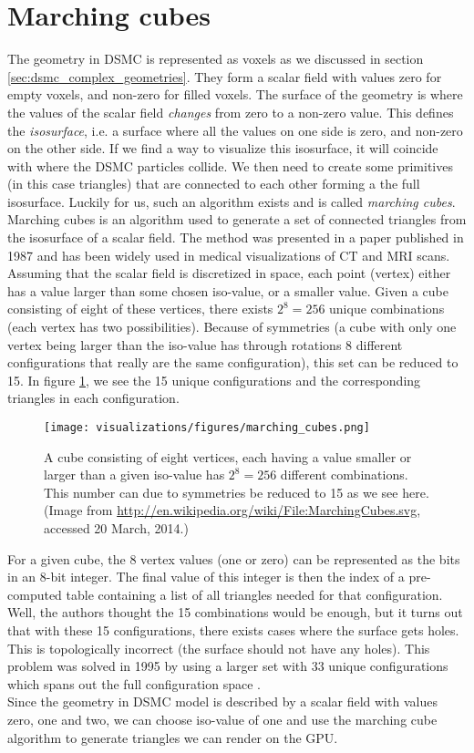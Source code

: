 \section{Marching cubes}
\label{sec:marching_cubes}
The geometry in DSMC is represented as voxels as we discussed in section \ref{sec:dsmc_complex_geometries}. They form a scalar field with values zero for empty voxels, and non-zero for filled voxels. The surface of the geometry is where the values of the scalar field \textit{changes} from zero to a non-zero value. This defines the \textit{isosurface}, i.e. a surface where all the values on one side is zero, and non-zero on the other side. If we find a way to visualize this isosurface, it will coincide with where the DSMC particles collide. We then need to create some primitives (in this case triangles) that are connected to each other forming a the full isosurface. Luckily for us, such an algorithm exists and is called \textit{marching cubes}.\\
Marching cubes is an algorithm used to generate a set of connected triangles from the isosurface of a scalar field. The method was presented in a paper published in 1987 and has been widely used in medical visualizations of CT and MRI scans\cite{wiki:marching_cubes}. Assuming that the scalar field is discretized in space, each point (vertex) either has a value larger than some chosen iso-value, or a smaller value. Given a cube consisting of eight of these vertices, there exists $2^{8}=256$ unique combinations (each vertex has two possibilities). Because of symmetries (a cube with only one vertex being larger than the iso-value has through rotations 8 different configurations that really are the same configuration), this set can be reduced to 15. In figure \ref{fig:vis_marching_cubes}, we see the 15 unique configurations and the corresponding triangles in each configuration.
\begin{figure}[h]
\begin{center}
\texttt{[image: visualizations/figures/marching\_cubes.png]}
\end{center}
\caption{A cube consisting of eight vertices, each having a value smaller or larger than a given iso-value has $2^8=256$ different combinations. This number can due to symmetries be reduced to 15 as we see here. (Image from \url{http://en.wikipedia.org/wiki/File:MarchingCubes.svg}, accessed 20 March, 2014.)}
\label{fig:vis_marching_cubes}
\end{figure}
For a given cube, the 8 vertex values (one or zero) can be represented as the bits in an 8-bit integer. The final value of this integer is then the index of a pre-computed table containing a list of all triangles needed for that configuration. Well, the authors thought the 15 combinations would be enough, but it turns out that with these 15 configurations, there exists cases where the surface gets holes. This is topologically incorrect (the surface should not have any holes). This problem was solved in 1995 by using a larger set with 33 unique configurations which spans out the full configuration space \cite{chernyaev1995marching}.\\
Since the geometry in DSMC model is described by a scalar field with values zero, one and two, we can choose iso-value of one and use the marching cube algorithm to generate triangles we can render on the GPU. 